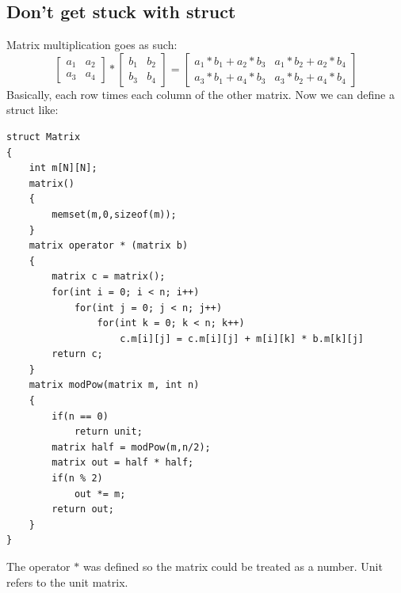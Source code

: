 \documentclass{IEEEtran}
\begin{document}
        \subsection{Don't get stuck with struct}
            Matrix multiplication goes as such:\\
            $$
                \begin{bmatrix}
                    a_1&a_2\\
                    a_3&a_4
                \end{bmatrix}*
                \begin{bmatrix}
                    b_1&b_2\\
                    b_3&b_4
                \end{bmatrix}=
                \begin{bmatrix}
                    a_1*b_1+a_2*b_3&a_1*b_2+a_2*b_4\\
                    a_3*b_1+a_4*b_3&a_3*b_2+a_4*b_4
                \end{bmatrix}
            $$
            Basically, each row times each column of the other matrix. Now we can define a struct like:
            \begin{lstlisting}
struct Matrix
{
    int m[N][N];
    matrix()
    {
        memset(m,0,sizeof(m));
    }
    matrix operator * (matrix b)
    {
        matrix c = matrix();
        for(int i = 0; i < n; i++)
            for(int j = 0; j < n; j++)
                for(int k = 0; k < n; k++)
                    c.m[i][j] = c.m[i][j] + m[i][k] * b.m[k][j]
        return c;
    }
    matrix modPow(matrix m, int n)
    {
        if(n == 0)
            return unit;
        matrix half = modPow(m,n/2);
        matrix out = half * half;
        if(n % 2)
            out *= m;
        return out;
    }
}
            \end{lstlisting}
            The operator $*$ was defined so the matrix could be treated as a number. Unit refers to the unit matrix. 
\end{document}
